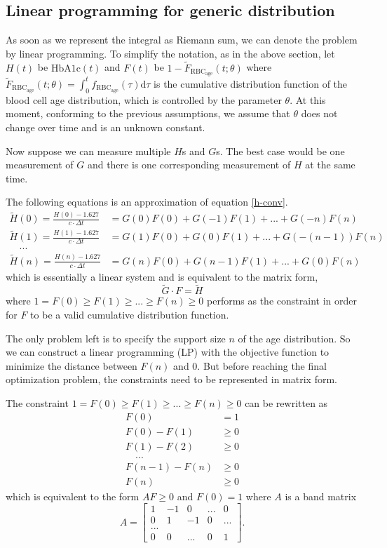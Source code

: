 \documentclass{article}
\newcommand{\hba}{\textrm{HbA1c}}
\newcommand{\f}{f_{\mathrm{RBC}_{\mathrm{age}}}}
\newcommand{\dd}{\mathrm{d }}
\begin{document}
\subsection{Linear programming for generic distribution}
As soon as we represent the integral as Riemann sum, we can denote the problem by linear programming.
To simplify the notation, as in the above section, let $H(t)$ be $\hba(t)$ and $F(t)$ be $1-\tilde{F}_{\mathrm{RBC}_\mathrm{age}}(t;\theta)$ where $\tilde{F}_{\mathrm{RBC}_\mathrm{age}}(t;\theta)=\int_0^{t}\f(\tau)\dd \tau$ is the cumulative distribution function of the blood cell age distribution, which is controlled by the parameter $\theta$. At this moment, conforming to the previous assumptions, we assume that $\theta$ does not change over time and is an unknown constant.

Now suppose we can measure multiple $H$s and $G$s. The best case would be one measurement of $G$ and there is one corresponding measurement of $H$ at the same time.

The following equations is an approximation of equation \ref{h-conv}. 
\begin{align*}
\tilde{H}(0) = \frac{H(0)-1.627}{c\cdot \Delta t} & = G(0)F(0) + G(-1)F(1) + ... + G(-n)F(n) \\
\tilde{H}(1) = \frac{H(1)-1.627}{c\cdot \Delta t} & = G(1)F(0) + G(0)F(1) + ... + G(-(n-1))F(n) \\
\quad...\\
\tilde{H}(n) = \frac{H(n)-1.627}{c\cdot \Delta t} & = G(n)F(0) + G(n-1)F(1) + ... + G(0)F(n) 
\end{align*}
which is essentially a linear system and is equivalent to the matrix form,
\[\tilde{G}\cdot F = \tilde{H}\]
where $1=F(0)\geq F(1)\geq ...\geq F(n)\geq 0$ performs as the  constraint in order for $F$ to be a valid cumulative distribution function.

The only problem left is to specify the support size $n$ of the age distribution. So we can construct a linear programming (LP) with the objective function to minimize the distance between $F(n)$ and 0. But before reaching the final optimization problem, the constraints need to be represented in matrix form.

The constraint $1=F(0)\geq F(1)\geq ...\geq F(n)\geq 0$ can be rewritten as 
\begin{align*}
F(0) & = 1\\
F(0)-F(1) &\geq 0 \\
F(1)-F(2) &\geq 0 \\
\quad ... \\
F(n-1)-F(n) &\geq 0 \\
F(n) &\geq 0
\end{align*}
which is equivalent to the form $AF\geq 0$ and $F(0)=1$ where $A$ is a band matrix
\[A = 
\begin{bmatrix}
1 &-1 & 0 & ... & 0 \\
0& 1 & -1 & 0 & ... \\
...\\
0 & 0&... &0 & 1
\end{bmatrix}.
\]
\end{document}
